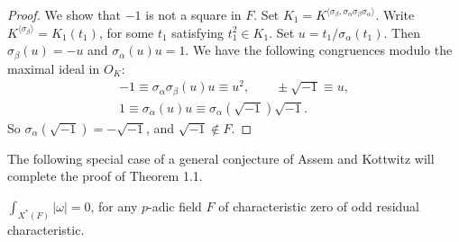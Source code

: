 \documentclass{amsart}
\newenvironment{cthm}[1]
  {\renewcommand\thethm{\sc #1}\thm}
  {\endthm}
\begin{document}
\begin{proof}
We show that $-1$ is not a square in $F$.  Set $K_1 = 
K^{\langle\sigma_\beta,\sigma_\alpha\sigma_\beta\sigma_\alpha\rangle}$.
Write $K^{\langle\sigma_\beta\rangle} =
K_1(t_1)$, for some $t_1$ satisfying $t_1^2\in K_1$.  Set $u=t_1/\sigma_\alpha(t_1)$.
Then $\sigma_\beta(u) = -u$ and $\sigma_\alpha(u) u =1$.  We have the
following congruences modulo the maximal ideal in $O_K$:
\begin{gather*}
-1\equiv \sigma_\alpha\sigma_\beta(u) u \equiv u^2,\qquad
 \pm\sqrt{-1} \equiv u,\\
1\equiv \sigma_\alpha(u) u \equiv \sigma_\alpha(\sqrt{-1}) \sqrt{-1}.
\end{gather*}
So $\sigma_\alpha(\sqrt{-1}) =-\sqrt{-1}$, and $\sqrt{-1}\not\in F$.
\end{proof}

The following special case of  a general conjecture
of Assem and Kottwitz will complete the proof of Theorem 1.1.

\bigskip
\noindent
\begin{cthm}{Theorem 3.3}   $\int_{X^*(F)}|\omega| = 0$, 
for any $p$-adic field $F$
of characteristic zero of odd residual characteristic.
\end{cthm}
\end{document}
